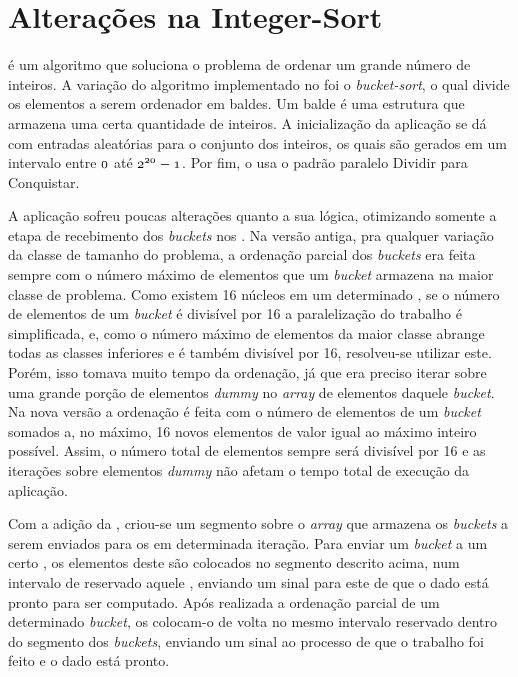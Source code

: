 \section{Alterações na Integer-Sort}
\label{sec:alteracoesis}

\textit{\IS} é um algoritmo que soluciona o problema de ordenar um grande número de inteiros. A variação do algoritmo implementado no \capb foi o \textit{bucket-sort}, o qual divide os elementos a serem ordenador em baldes. Um balde é uma estrutura que armazena uma certa quantidade de inteiros. A inicialização da aplicação se dá com entradas aleatórias para o conjunto dos inteiros, os quais são gerados em um intervalo entre $\mathnormal{0}$ até $\mathnormal{2^{20} - 1}$. Por fim, o \IS usa o padrão paralelo Dividir para Conquistar.

A aplicação \textit{\IS} sofreu poucas alterações quanto a sua lógica, otimizando somente a etapa de recebimento dos \textit{buckets} nos \slaves. Na versão antiga, pra qualquer variação da classe de tamanho do problema, a ordenação parcial dos \textit{buckets} era feita sempre com o número máximo de elementos que um \textit{bucket} armazena na maior classe de problema. Como existem 16 núcleos em um determinado \cluster, se o número de elementos de um \textit{bucket} é divisível por 16 a paralelização do trabalho é simplificada, e, como o número máximo de elementos da maior classe abrange todas as classes inferiores e é também divisível por 16, resolveu-se utilizar este. Porém, isso tomava muito tempo da ordenação, já que era preciso iterar sobre uma grande porção de elementos \textit{dummy} no \textit{array} de elementos daquele \textit{bucket}. Na nova versão a ordenação é feita com o número de elementos de um \textit{bucket} somados a, no máximo, 16 novos elementos de valor igual ao máximo inteiro possível. Assim, o número total de elementos sempre será divisível por 16 e as iterações sobre elementos \textit{dummy} não afetam o tempo total de execução da aplicação.

Com a adição da \API \ASYNC, criou-se um segmento sobre o \textit{array} que armazena os \textit{buckets} a serem enviados para os \CCs em determinada iteração. Para enviar um \textit{bucket} a um certo \CC, os elementos deste são colocados no segmento descrito acima, num intervalo de \offsets reservado aquele \CC, enviando um sinal para este \slave de que o dado está pronto para ser computado. Após realizada a ordenação parcial de um determinado \textit{bucket}, os \CCs colocam-o de volta no mesmo intervalo reservado dentro do segmento dos \textit{buckets}, enviando um sinal ao processo \master de que o trabalho foi feito e o dado está pronto.
 

